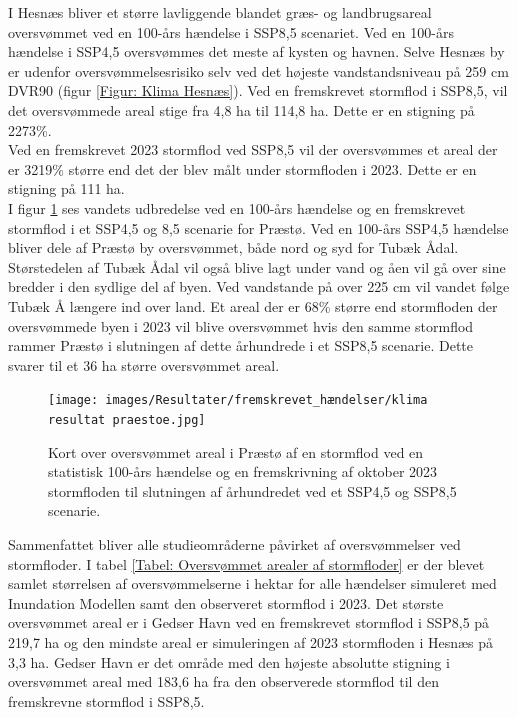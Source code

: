 I Hesnæs bliver et større lavliggende blandet græs- og landbrugsareal oversvømmet ved en 100-års hændelse i SSP8,5 scenariet. Ved en 100-års hændelse i SSP4,5 oversvømmes det meste af kysten og havnen. Selve Hesnæs by er udenfor oversvømmelsesrisiko selv ved det højeste vandstandsniveau på 259 cm DVR90 (figur \ref{Figur: Klima Hesnæs}). Ved en fremskrevet stormflod i SSP8,5, vil det oversvømmede areal stige fra 4,8 ha til 114,8 ha. Dette er en stigning på 2273\%. \\
Ved en fremskrevet 2023 stormflod ved SSP8,5 vil der oversvømmes et areal der er 3219\% større end det der blev målt under stormfloden i 2023. Dette er en stigning på 111 ha. \\

I figur \ref{Figur: Klima Præstø} ses vandets udbredelse ved en 100-års hændelse og en fremskrevet stormflod i et SSP4,5 og 8,5 scenarie for Præstø. Ved en 100-års SSP4,5 hændelse bliver dele af Præstø by oversvømmet, både nord og syd for Tubæk Ådal. Størstedelen af Tubæk Ådal vil også blive lagt under vand og åen vil gå over sine bredder i den sydlige del af byen. Ved vandstande på over 225 cm vil vandet følge Tubæk Å længere ind over land. Et areal der er 68\% større end stormfloden der oversvømmede byen i 2023 vil blive oversvømmet hvis den samme stormflod rammer Præstø i slutningen af dette århundrede i et SSP8,5 scenarie. Dette svarer til et 36 ha større oversvømmet areal.
\begin{figure}[H]
    \centering
    \texttt{[image: images/Resultater/fremskrevet\_hændelser/klima resultat praestoe.jpg]}
    \caption{Kort over oversvømmet areal i Præstø af en stormflod ved en statistisk 100-års hændelse og en fremskrivning af oktober 2023 stormfloden til slutningen af århundredet ved et SSP4,5 og SSP8,5 scenarie.}
    \label{Figur: Klima Præstø}
\end{figure}
Sammenfattet bliver alle studieområderne påvirket af oversvømmelser ved stormfloder. I tabel \ref{Tabel: Oversvømmet arealer af stormfloder} er der blevet samlet størrelsen af oversvømmelserne i hektar for alle hændelser simuleret med Inundation Modellen samt den observeret stormflod i 2023. Det største oversvømmet areal er i Gedser Havn ved en fremskrevet stormflod i SSP8,5 på 219,7 ha og den mindste areal er simuleringen af 2023 stormfloden i Hesnæs på 3,3 ha. Gedser Havn er det område med den højeste absolutte stigning i oversvømmet areal med 183,6 ha fra den observerede stormflod til den fremskrevne stormflod i SSP8,5. 

